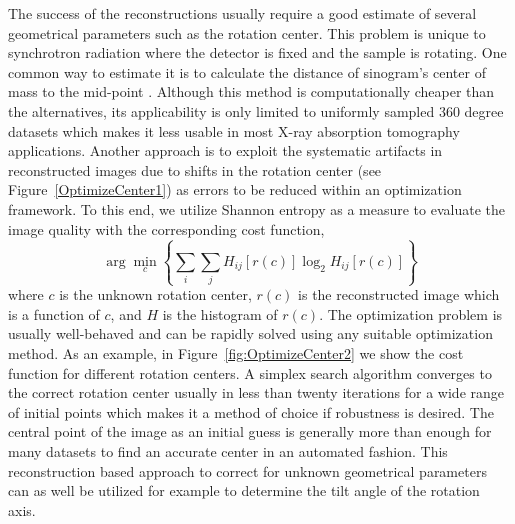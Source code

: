 \documentclass[pdf]{iucr}              %
\begin{document}
The success of the reconstructions usually require a good estimate of several geometrical parameters such as the rotation center. This problem is unique to synchrotron radiation where the detector is fixed and the sample is rotating. One common way to estimate it is to calculate the distance of sinogram's center of mass to the mid-point \cite{Azevedo}. Although this method is computationally cheaper than the alternatives, its applicability is only limited to uniformly sampled 360 degree datasets which makes it less usable in most X-ray absorption tomography applications. Another approach is to exploit the systematic artifacts in reconstructed images due to shifts in the rotation center \cite{donath_spie_2006} (see Figure~\ref{OptimizeCenter1}) as errors to be reduced within an optimization framework. To this end, we utilize Shannon entropy as a measure to evaluate the image quality with the corresponding cost function,
\begin{equation}
\arg \min_c \left\{\sum_i \sum_jH_{ij}\left[r(c)\right]\log_2 H_{ij}\left[r(c)\right]\right\}
\end{equation}
where $c$ is the unknown rotation center, $r(c)$ is the reconstructed image which is a function of $c$, and $H$ is the histogram of $r(c)$. The optimization problem is usually well-behaved and can be rapidly solved using any suitable optimization method.  As an example, in Figure~\ref{fig:OptimizeCenter2} we show the cost function for different rotation centers. A simplex search algorithm converges to the correct rotation center usually in less than twenty iterations for a wide range of initial points which makes it a method of choice if robustness is desired. The central point of the image as an initial guess is generally more than enough for many datasets to find an accurate center in an automated fashion. This reconstruction based approach to correct for unknown geometrical parameters can as well be utilized for example to determine the tilt angle of the rotation axis.
\end{document}
